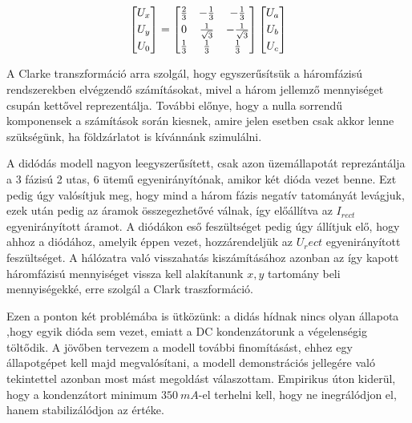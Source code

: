 \begin{equation}
\centering
\begin{bmatrix}
       U_x\\[0.3em]
       U_y\\[0.3em]
       U_0 
\end{bmatrix}
=
\begin{bmatrix}
       \frac{2}{3} & -\frac{1}{3} & -\frac{1}{3}  \\[0.3em]
       0 & \frac{1}{\sqrt{3}} & -\frac{1}{\sqrt{3}}  \\[0.3em]
       \frac{1}{3} & \frac{1}{3} & \frac{1}{3}    
\end{bmatrix}
\begin{bmatrix}
       U_a\\[0.3em]
       U_b\\[0.3em]
       U_c    
\end{bmatrix}
\end{equation}

A Clarke transzformáció arra szolgál, hogy egyszerűsítsük a háromfázisú rendszerekben elvégzendő számításokat, mivel a három jellemző mennyiséget csupán kettővel reprezentálja. További előnye, hogy a nulla sorrendű komponensek a számítások során kiesnek, amire jelen esetben csak akkor lenne szükségünk, ha földzárlatot is kívánnánk szimulálni.

A didódás modell nagyon leegyszerűsített, csak azon üzemállapotát reprezántálja a 3 fázisú 2 utas, 6 ütemű egyenirányítónak, amikor két dióda vezet benne. Ezt pedig úgy valósítjuk meg, hogy mind a három fázis negatív tatományát levágjuk, ezek után pedig az áramok összegezhetővé válnak, így előállítva az $I_{rect}$ egyenirányított áramot. A diódákon eső feszültséget pedig úgy állítjuk elő, hogy ahhoz a diódához, amelyik éppen vezet, hozzárendeljük az $U_rect$ egyenirányított feszültséget. A hálózatra való visszahatás kiszámításához azonban az így kapott háromfázisú mennyiséget vissza kell alakítanunk $x,y$ tartomány beli mennyiségekké, erre szolgál a Clark traszformáció.

Ezen a ponton két problémába is ütközünk: a didás hídnak nincs olyan állapota ,hogy egyik dióda sem vezet, emiatt a DC kondenzátorunk a végelenségig töltődik. A jövőben tervezem a modell további finomításást, ehhez egy állapotgépet kell majd megvalósítani, a modell demonstrációs jellegére való tekintettel azonban most mást megoldást válaszottam. Empirikus úton kiderül, hogy a kondenzátort minimum $350\ mA$-el terhelni kell, hogy ne inegrálódjon el, hanem stabilizálódjon az értéke.

